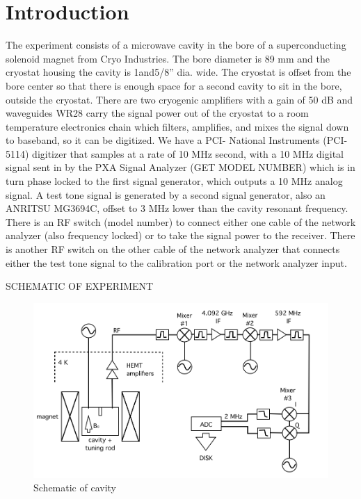 \documentclass[11pt]{article}
\begin{document}
\section{Introduction}

The experiment consists of a microwave cavity in the bore of a superconducting solenoid magnet from Cryo Industries. The bore diameter is 89 mm and the cryostat housing the cavity is 1and5/8” dia. wide. The cryostat is offset from the bore center so that there is enough space for a second cavity to sit in the bore, outside the cryostat. There are two cryogenic amplifiers with a gain of 50 dB and waveguides WR28 carry the signal power out of the cryostat to a room temperature electronics chain which filters, amplifies, and mixes the signal down to baseband, so it can be digitized. We have a PCI- National Instruments (PCI-5114) digitizer that samples at a rate of 10 MHz second, with a 10 MHz digital signal sent in by the PXA Signal Analyzer (GET MODEL NUMBER) which is in turn phase locked to the first signal generator, which outputs a 10 MHz analog signal. A test tone signal is generated by a second signal generator, also an ANRITSU MG3694C, offset to 3 MHz lower than the cavity resonant frequency. There is an RF switch (model number) to connect either one cable of the network analyzer (also frequency locked) or to take the signal power to the receiver. There is another RF switch on the other cable of the network analyzer that connects either the test tone signal to the calibration port or the network analyzer input. 

SCHEMATIC OF EXPERIMENT
\begin{figure}
\includegraphics[width=\textwidth]{schematicnew}
\caption{Schematic of cavity}
\end{figure}
\end{document}
